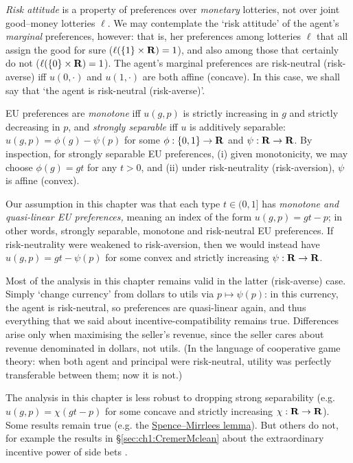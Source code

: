 \emph{Risk attitude} is a property of preferences over \emph{monetary} lotteries, not over joint good--money lotteries $\ell$.
We may contemplate the `risk attitude' of the agent's \emph{marginal} preferences, however:
that is, her preferences among lotteries $\ell$ that all assign the good for sure ($\ell( \{1\} \times \mathbf{R} ) = 1$),
and also among those that certainly do not ($\ell( \{0\} \times \mathbf{R} ) = 1$).
The agent's marginal preferences are risk-neutral (risk-averse)
iff $u(0,\cdot)$ and $u(1,\cdot)$ are both affine (concave).
In this case, we shall say that `the agent is risk-neutral (risk-averse)'.

EU preferences are \emph{monotone} iff $u(g,p)$ is strictly increasing in $g$ and strictly decreasing in $p$,
and \emph{strongly separable} iff $u$ is additively separable:
$u(g,p) = \phi(g) - \psi(p)$
for some $\phi : \{0,1\} \to \mathbf{R}$ and $\psi : \mathbf{R} \to \mathbf{R}$.
By inspection, for strongly separable EU preferences,
(i) given monotonicity, we may choose $\phi(g) = gt$ for any $t>0$, and
(ii) under risk-neutrality (risk-aversion), $\psi$ is affine (convex).

Our assumption in this chapter
was that each type $t \in (0,1]$ has \emph{monotone and quasi-linear EU preferences,} meaning an index of the form $u(g,p) = gt - p$;
in other words, strongly separable, monotone and risk-neutral EU preferences.
If risk-neutrality were weakened to risk-aversion,
then we would instead have $u(g,p) = gt - \psi(p)$ for some convex and strictly increasing $\psi : \mathbf{R} \to \mathbf{R}$.

Most of the analysis in this chapter remains valid in the latter (risk-averse) case.
Simply `change currency' from dollars to utils via $p \mapsto \psi(p)$: in this currency, the agent is risk-neutral, so preferences are quasi-linear again,
and thus everything that we said about incentive-compatibility remains true.
Differences arise only when maximising the seller's revenue, since the seller cares about revenue denominated in dollars, not utils.
(In the language of cooperative game theory: when both agent and principal were risk-neutral, utility was perfectly transferable between them; now it is not.)

The analysis in this chapter is less robust to dropping strong separability (e.g. $u(g,p) = \chi( gt - p )$ for some concave and strictly increasing $\chi : \mathbf{R} \to \mathbf{R}$).
Some results remain true (e.g. the \hyperref[proposition:SM_lemma]{Spence--Mirrlees lemma}).
But others do not, for example the results in §\ref{sec:ch1:CremerMclean} about the extraordinary incentive power of side bets \parencite[see][]{Robert1991}.



